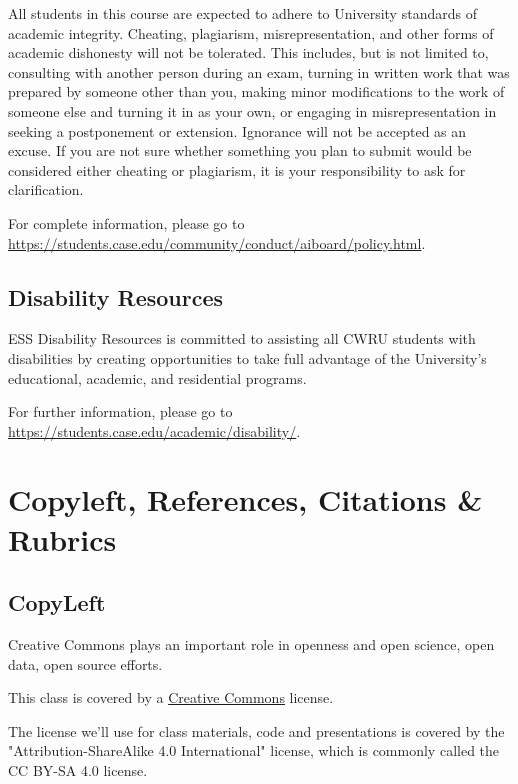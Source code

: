 \documentclass[11pt]{article} %
\begin{document}
    All students in this course are expected to adhere to University standards of academic integrity. Cheating, plagiarism, misrepresentation, and other forms of academic dishonesty will not be tolerated. 
    This includes, but is not limited to, consulting with another person during an exam, turning in written work that was prepared by someone other than you, making minor modifications to the work of someone else and turning it in as your own, or engaging in misrepresentation in seeking a postponement or extension. 
    Ignorance will not be accepted as an excuse. 
    If you are not sure whether something you plan to submit would be considered either cheating or plagiarism, it is your responsibility to ask for clarification.  
    
    For complete information, please go to \href{"https://students.case.edu/community/conduct/aiboard/policy.html"}{https://students.case.edu/community/conduct/aiboard/policy.html}. 
  
  \subsection{Disability Resources}
  
    ESS Disability Resources is committed to assisting all CWRU students with disabilities by creating opportunities to take full advantage of the University's educational, academic, and residential programs.  
    
    For further information, please go to \href{"https://students.case.edu/academic/disability/''}{https://students.case.edu/academic/disability/}. 


\section{Copyleft, References, Citations  \& Rubrics}

  \subsection{CopyLeft}
  
    Creative Commons plays an important role in openness and open science, open data, open source efforts. 
    
    This class is covered by a \href{"http://creativecommons.org/licenses/"}{Creative Commons} license. 
    
    The license we'll use for class materials, code and presentations is covered by  the "Attribution-ShareAlike 4.0 International" license, which is commonly called the CC BY-SA 4.0 license. \cite{_creative_2015}




\end{document}

